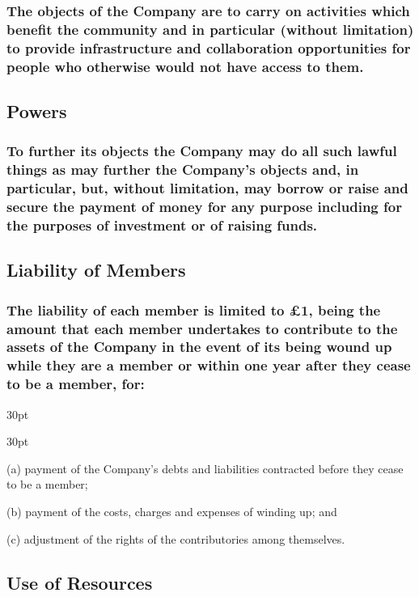 \documentclass[12pt]{article}
\def\clauseindent{30pt}
\newenvironment{subindentlist}{\begin{adjustwidth}{\clauseindent}{}\begin{labeledlist}{\clauseindent}}{\end{labeledlist}\end{adjustwidth}}
\begin{document}
\subsubsection[Broad objective of the Company and Hackerspace]{The objects of the Company are to carry on activities which benefit the community and in particular (without limitation) to provide infrastructure and collaboration opportunities for people who otherwise would not have access to them.}

\subsection{Powers}
\subsubsection[Broad powers of the Company and Hackerspace]{To further its objects the Company may do all such lawful things as may further the Company's objects and, in particular, but, without limitation, may borrow or raise and secure the payment of money for any purpose including for the purposes of investment or of raising funds.}

\subsection{Liability of Members}
\subsubsection[Liability of Members is \pounds{1}]{The liability of each member is limited to \pounds{1}, being the amount that each member undertakes to contribute to the assets of the Company in the event of its being wound up while they are a member or within one year after they cease to be a member, for:}
\begin{subindentlist}
  \item [(a)] payment of the Company's debts and liabilities contracted before they cease to be a member;
  \item [(b)] payment of the costs, charges and expenses of winding up; and
  \item [(c)] adjustment of the rights of the contributories among themselves.
\end{subindentlist}

\subsection{Use of Resources}
\end{document}
